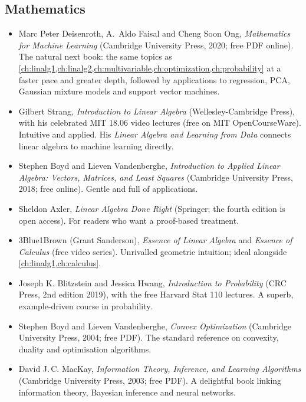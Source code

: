 \subsection{Mathematics}

\begin{itemize}[itemsep=3pt]
  \item Marc Peter Deisenroth, A.~Aldo Faisal and Cheng Soon Ong,
    \emph{Mathematics for Machine Learning} (Cambridge University Press, 2020;
    free PDF online). The natural next book: the same topics as
    \cref{ch:linalg1,ch:linalg2,ch:multivariable,ch:optimization,ch:probability}
    at a faster pace and greater depth, followed by applications to regression,
    PCA, Gaussian mixture models and support vector machines.
  \item Gilbert Strang, \emph{Introduction to Linear Algebra} (Wellesley-Cambridge
    Press), with his celebrated MIT 18.06 video lectures (free on MIT
    OpenCourseWare). Intuitive and applied. His \emph{Linear Algebra and Learning
    from Data} connects linear algebra to machine learning directly.
  \item Stephen Boyd and Lieven Vandenberghe, \emph{Introduction to Applied
    Linear Algebra: Vectors, Matrices, and Least Squares} (Cambridge University
    Press, 2018; free online). Gentle and full of applications.
  \item Sheldon Axler, \emph{Linear Algebra Done Right} (Springer; the fourth
    edition is open access). For readers who want a proof-based treatment.
  \item 3Blue1Brown (Grant Sanderson), \emph{Essence of Linear Algebra} and
    \emph{Essence of Calculus} (free video series). Unrivalled geometric
    intuition; ideal alongside \cref{ch:linalg1,ch:calculus}.
  \item Joseph K. Blitzstein and Jessica Hwang, \emph{Introduction to Probability}
    (CRC Press, 2nd edition 2019), with the free Harvard Stat 110 lectures. A
    superb, example-driven course in probability.
  \item Stephen Boyd and Lieven Vandenberghe, \emph{Convex Optimization}
    (Cambridge University Press, 2004; free PDF). The standard reference on
    convexity, duality and optimisation algorithms.
  \item David J.\,C. MacKay, \emph{Information Theory, Inference, and Learning
    Algorithms} (Cambridge University Press, 2003; free PDF). A delightful book
    linking information theory, Bayesian inference and neural networks.
\end{itemize}

